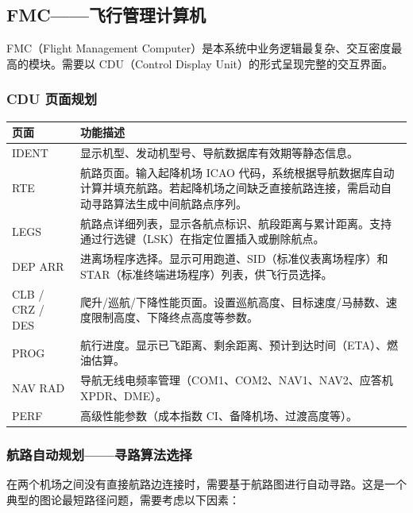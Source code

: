 \documentclass[12pt,a4paper]{ctexart}
\begin{document}
\subsection{FMC——飞行管理计算机}

FMC（Flight Management Computer）是本系统中业务逻辑最复杂、交互密度最高的模块。需要以 CDU（Control Display Unit）的形式呈现完整的交互界面。

\subsubsection{CDU 页面规划}

\begin{longtable}{>{\raggedright\arraybackslash}p{2.5cm} >{\raggedright\arraybackslash}p{11cm}}
\toprule
\textbf{页面} & \textbf{功能描述} \\
\midrule
IDENT & 显示机型、发动机型号、导航数据库有效期等静态信息。 \\
\addlinespace
RTE & 航路页面。输入起降机场 ICAO 代码，系统根据导航数据库自动计算并填充航路。若起降机场之间缺乏直接航路连接，需启动自动寻路算法生成中间航路点序列。 \\
\addlinespace
LEGS & 航路点详细列表，显示各航点标识、航段距离与累计距离。支持通过行选键（LSK）在指定位置插入或删除航点。 \\
\addlinespace
DEP ARR & 进离场程序选择。显示可用跑道、SID（标准仪表离场程序）和 STAR（标准终端进场程序）列表，供飞行员选择。 \\
\addlinespace
CLB / CRZ / DES & 爬升/巡航/下降性能页面。设置巡航高度、目标速度/马赫数、速度限制高度、下降终点高度等参数。 \\
\addlinespace
PROG & 航行进度。显示已飞距离、剩余距离、预计到达时间（ETA）、燃油估算。 \\
\addlinespace
NAV RAD & 导航无线电频率管理（COM1、COM2、NAV1、NAV2、应答机 XPDR、DME）。 \\
\addlinespace
PERF & 高级性能参数（成本指数 CI、备降机场、过渡高度等）。 \\
\bottomrule
\end{longtable}

\subsubsection{航路自动规划——寻路算法选择}

在两个机场之间没有直接航路边连接时，需要基于航路图进行自动寻路。这是一个典型的图论最短路径问题，需要考虑以下因素：
\end{document}
